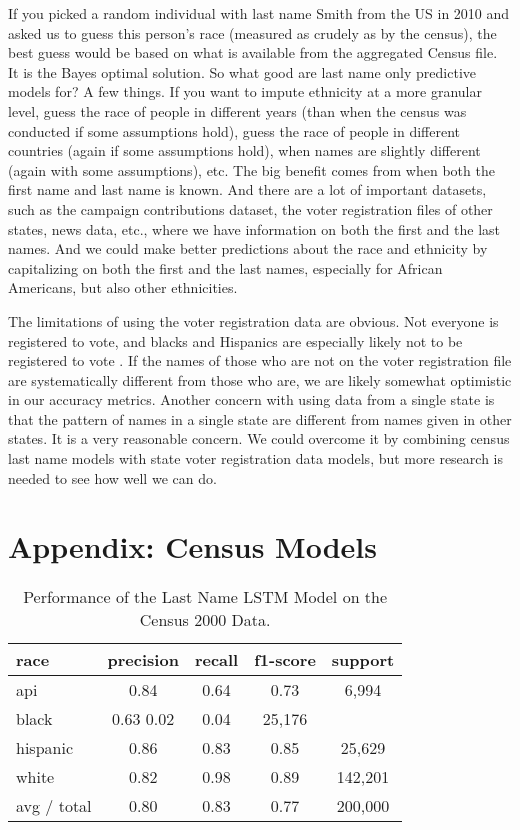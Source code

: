 \documentclass[12pt, letterpaper]{article}
\begin{document}
If you picked a random individual with last name Smith from the US in 2010 and asked us to guess this person's race (measured as crudely as by the census), the best guess would be based on what is available from the aggregated Census file. It is the Bayes optimal solution. So what good are last name only predictive models for? A few things. If you want to impute ethnicity at a more granular level, guess the race of people in different years (than when the census was conducted if some assumptions hold), guess the race of people in different countries (again if some assumptions hold), when names are slightly different (again with some assumptions), etc. The big benefit comes from when both the first name and last name is known. And there are a lot of important datasets, such as the campaign contributions dataset, the voter registration files of other states, news data, etc., where we have information on both the first and the last names. And we could make better predictions about the race and ethnicity by capitalizing on both the first and the last names, especially for African Americans, but also other ethnicities.

The limitations of using the voter registration data are obvious. Not everyone is registered to vote, and blacks and Hispanics are especially likely not to be registered to vote \citep{ansolabehere2011gender}. If the names of those who are not on the voter registration file are systematically different from those who are, we are likely somewhat optimistic in our accuracy metrics. Another concern with using data from a single state is that the pattern of names in a single state are different from names given in other states. It is a very reasonable concern. We could overcome it by combining census last name models with state voter registration data models, but more research is needed to see how well we can do.

\clearpage



\section*{Appendix: Census Models}

\begin{table}[h!]
\centering
\caption{Performance of the Last Name LSTM Model on the Census 2000 Data.}
\begin{tabular}{ l c c c c }
\hline    
   race & precision & recall & f1-score & support\\
\hline
   api  &     0.84    &  0.64 &     0.73     & 6,994\\
      black   &    0.63      0.02 &     0.04    & 25,176\\
   hispanic    &   0.86   &   0.83 &     0.85   &  25,629\\
      white    &   0.82  &    0.98  &    0.89  &  142,201\\

avg / total    &   0.80 &     0.83   &   0.77 &   200,000\\
\hline
\end{tabular}
\label{table:last_name_census_2000}
\end{table}
\end{document}
